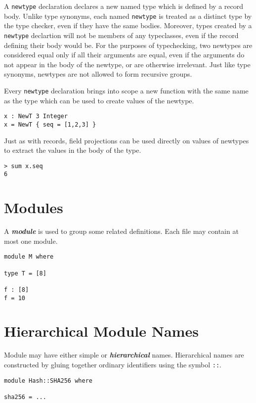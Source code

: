 A \texttt{newtype} declaration declares a new named type which is
defined by a record body. Unlike type synonyms, each named
\texttt{newtype} is treated as a distinct type by the type checker, even
if they have the same bodies. Moreover, types created by a
\texttt{newtype} declartion will not be members of any typeclasses, even
if the record defining their body would be. For the purposes of
typechecking, two newtypes are considered equal only if all their
arguments are equal, even if the arguments do not appear in the body of
the newtype, or are otherwise irrelevant. Just like type synonyms,
newtypes are not allowed to form recursive groups.

Every \texttt{newtype} declaration brings into scope a new function with
the same name as the type which can be used to create values of the
newtype.

\begin{verbatim}
x : NewT 3 Integer
x = NewT { seq = [1,2,3] }
\end{verbatim}

Just as with records, field projections can be used directly on values
of newtypes to extract the values in the body of the type.

\begin{verbatim}
> sum x.seq
6
\end{verbatim}

\section{Modules}\label{modules}

A \textbf{\emph{module}} is used to group some related definitions. Each
file may contain at most one module.

\begin{verbatim}
module M where

type T = [8]

f : [8]
f = 10
\end{verbatim}

\section{Hierarchical Module Names}\label{hierarchical-module-names}

Module may have either simple or \textbf{\emph{hierarchical}} names.
Hierarchical names are constructed by gluing together ordinary
identifiers using the symbol \texttt{::}.

\begin{verbatim}
module Hash::SHA256 where

sha256 = ...
\end{verbatim}

